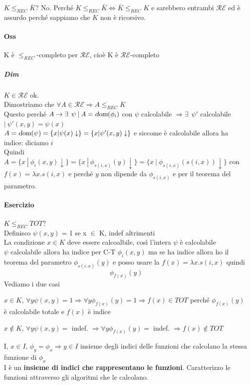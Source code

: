 \documentclass[10pt]{book}
\begin{document}
\pagebreak
$K \leq_{REC} \overline{K}$? No. Perché $K \leq_{REC} \overline{K} \Leftrightarrow \overline{K} \leq_{REC} K$ e sarebbero entrambi $\mathscr{RE}$ ed è assurdo perché sappiamo che $K$ non è ricorsivo.
\paragraph{Oss} K è $\leq_{REC}$-completo per $\mathscr{RE}$, cioè K è $\mathscr{RE}$-completo
\subparagraph{Dim} $K \in \mathscr{RE}$ ok.\\
Dimostriamo che $\forall A \in \mathscr{RE} \Rightarrow A \leq_{REC} K$\\
Questo perché $A \rightarrow \exists\:\:\psi\: |\: A = \textsl{dom}(\phi_i)$ con $\psi$ calcolabile $\Rightarrow \exists\:\:\psi'$ calcolabile $|\: \psi'(x, y) = \psi(x)$\\
$A = \textsl{dom}(\psi) = \{x | \psi(x)\downarrow\} = \{x | \psi'(x, y)\downarrow\}$ e siccome è calcolabile allora ha indice: diciamo $i$\\
Quindi $A = \{x \: |\: \phi_i(x, y)\downarrow\} = \{x\: |\: \phi_{s(i, x)}(y)\downarrow\} = \{x\: |\: \phi_{s(i, x)}(s(i, x))\downarrow\}$ con $f(x) = \lambda x.s(i, x)$ e perché $y$ non dipende da $\phi_{s(i, x)}$ e per il teorema del parametro.
\paragraph{Esercizio} $K \leq_{REC} TOT$?\\
Definisco $\psi(x, y)$ = 1 se x $\in$ K, indef altrimenti\\
La condizione $x \in K$ deve essere calcoalbile, così l'intera $\psi$ è calcolabile\\
$\psi$ calcolabile allora ha indice per C-T $\phi_i(x, y)$ ma se ha indice allora ho il teorema del parametro $\phi_{s(i, x)}(y)$ e posso usare la $f(x) = \lambda x.s(i, x)$ quindi
$$\phi_{f(x)}(y)$$
Vediamo i due casi
\begin{list}{}{}
	\item $x \in K$, $\forall y \psi(x, y) = 1 \Rightarrow \forall y \phi_{f(x)}(y) = 1 \Rightarrow f(x) \in TOT$ perché $\phi_{f(x)}(y)$ è calcolabile totale e $f(x)$ è indice
	\item $x \not\in K$, $\forall y \psi(x, y) =$ indef. $\Rightarrow \forall y \phi_{f(x)}(y) =$ indef. $\Rightarrow f(x) \not\in TOT$
\end{list}
I, $x \in I$, $\phi_y = \phi_x \Rightarrow y \in I$ insieme degli indici delle funzioni che calcolano la stessa funzione di $\phi_x$\\
I è un \textbf{insieme di indici che rappresentano le funzioni}. Caratterizzo le funzioni attraverso gli algoritmi che le calcolano.
\end{document}

